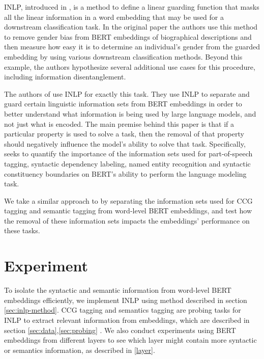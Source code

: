 \documentclass[11pt,a4paper]{article}
\begin{document}
INLP, introduced in \citealp{inlp}, is a method to define a linear guarding function that masks all the linear information in a word embedding that may be used for a downstream classification task. In the original paper the authors use this method to remove gender bias from BERT embeddings of biographical descriptions and then measure how easy it is to determine an individual's gender from the guarded embedding by using various downstream classification methods. Beyond this example, the authors hypothesize several additional use cases for this procedure, including information disentanglement.

The authors of \citealp{amnesia} use INLP for exactly this task. They use INLP to separate and guard certain linguistic information sets from BERT embeddings in order to better understand what information is being used by large language models, and not just what is encoded. The main premise behind this paper is that if a particular property is used to solve a task, then the removal of that property should negatively influence the model's ability to solve that task. Specifically, \citealp{amnesia} seeks to quantify the importance of the information sets used for part-of-speech tagging, syntactic dependency labeling, named entity recognition and syntactic constituency boundaries on BERT's ability to perform the language modeling task.

We take a similar approach to \citealp{amnesia} by separating the information sets used for CCG tagging and semantic tagging from word-level BERT embeddings, and test how the removal of these information sets impacts the embeddings' performance on these tasks.



\section{Experiment}
\label{sec:method}


To isolate the syntactic and semantic information from word-level BERT embeddings efficiently, we implement INLP using method described in section \ref{sec:inlp-method}. CCG tagging and semantics tagging are probing tasks for INLP to extract relevant information from embeddings, which are described in section \ref{sec:data},\ref{sec:probing} . %
 We also conduct experiments using BERT embeddings from different layers to see which layer might contain more syntactic or semantics information, as described in \ref{layer}. %
\end{document}

